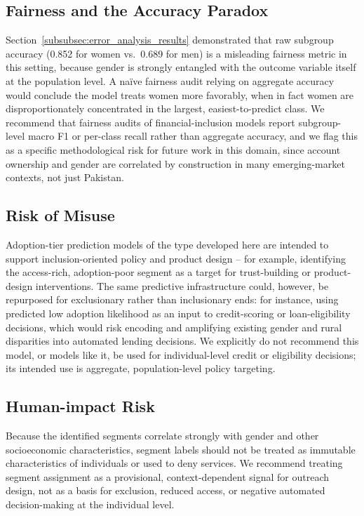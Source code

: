 \documentclass[conference]{IEEEtran}
\begin{document}
\subsection{Fairness and the Accuracy Paradox}
\label{subsec:fairness_accuracy_paradox}
Section~\ref{subsubsec:error_analysis_results} demonstrated that raw subgroup accuracy (0.852 for women vs.\ 0.689 for men) is a misleading fairness metric in this setting, because gender is strongly entangled with the outcome variable itself at the population level. A na\"ive fairness audit relying on aggregate accuracy would conclude the model treats women more favorably, when in fact women are disproportionately concentrated in the largest, easiest-to-predict class. We recommend that fairness audits of financial-inclusion models report subgroup-level macro F1 or per-class recall rather than aggregate accuracy, and we flag this as a specific methodological risk for future work in this domain, since account ownership and gender are correlated by construction in many emerging-market contexts, not just Pakistan.
 
\subsection{Risk of Misuse}
\label{subsec:risk_of_misuse}
Adoption-tier prediction models of the type developed here are intended to support inclusion-oriented policy and product design -- for example, identifying the access-rich, adoption-poor segment as a target for trust-building or product-design interventions. The same predictive infrastructure could, however, be repurposed for exclusionary rather than inclusionary ends: for instance, using predicted low adoption likelihood as an input to credit-scoring or loan-eligibility decisions, which would risk encoding and amplifying existing gender and rural disparities into automated lending decisions. We explicitly do not recommend this model, or models like it, be used for individual-level credit or eligibility decisions; its intended use is aggregate, population-level policy targeting.

\subsection{Human-impact Risk}
\label{subsec:human_impact_risk}
Because the identified segments correlate strongly with gender and other
socioeconomic characteristics, segment labels should not be treated as
immutable characteristics of individuals or used to deny services. We
recommend treating segment assignment as a provisional, context-dependent
signal for outreach design, not as a basis for exclusion, reduced access,
or negative automated decision-making at the individual level.
\end{document}
